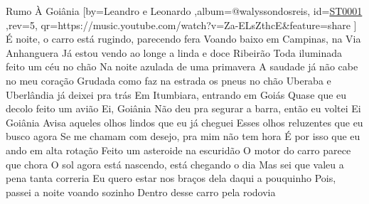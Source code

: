 \beginsong
{Rumo À Goiânia %
}[by={Leandro e Leonardo %
},album={@walyssondosreis},
id={\href{https://music.youtube.com/watch?v=Za-ELsZthcE&feature=share %
}{ST0001 %
}},rev={5}, %
qr={https://music.youtube.com/watch?v=Za-ELsZthcE&feature=share %
}]
\beginverse
É noite, o carro está rugindo, parecendo fera
Voando baixo em Campinas, na Via Anhanguera
Já estou vendo ao longe a linda e doce Ribeirão
Toda iluminada feito um céu no chão
Na noite azulada de uma primavera
\endverse
\beginverse
A saudade já não cabe no meu coração
Grudada como faz na estrada os pneus no chão
Uberaba e Uberlândia já deixei pra trás
Em Itumbiara, entrando em Goiás
Quase que eu decolo feito um avião
\endverse
\beginchorus
Ei, Goiânia
Não deu pra segurar a barra, então eu voltei
Ei Goiânia
Avisa aqueles olhos lindos que eu já cheguei
\endchorus
{}
\beginverse
Esses olhos reluzentes que eu busco agora
Se me chamam com desejo, pra mim não tem hora
É por isso que eu ando em alta rotação
Feito um asteroide na escuridão
O motor do carro parece que chora
\endverse
\beginverse
O sol agora está nascendo, está chegando o dia
Mas sei que valeu a pena tanta correria
Eu quero estar nos braços dela daqui a pouquinho
Pois, passei a noite voando sozinho
Dentro desse carro pela rodovia
\endverse
{}
\vspace{4em} %
\begin{comment}
\lstset{basicstyle=\scriptsize\bf} %
\tab{Solo 1}
\begin{lstlisting}
E|-----------------------------------------------------|
B|-----------------------------------------------------|
G|-----------------------------------------------------|
D|-----------------------------------------------------|
A|-----------------------------------------------------|
E|-----------------------------------------------------|
\end{lstlisting}
\end{comment}
